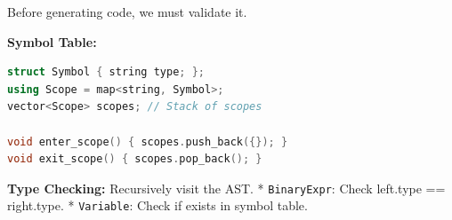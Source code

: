 Before generating code, we must validate it.

\textbf{Symbol Table:}

\begin{lstlisting}[language={C++}]
struct Symbol { string type; };
using Scope = map<string, Symbol>;
vector<Scope> scopes; // Stack of scopes

void enter_scope() { scopes.push_back({}); }
void exit_scope() { scopes.pop_back(); }
\end{lstlisting}

\textbf{Type Checking:} Recursively visit the AST. *
\passthrough{\lstinline!BinaryExpr!}: Check left.type == right.type. *
\passthrough{\lstinline!Variable!}: Check if exists in symbol table.
